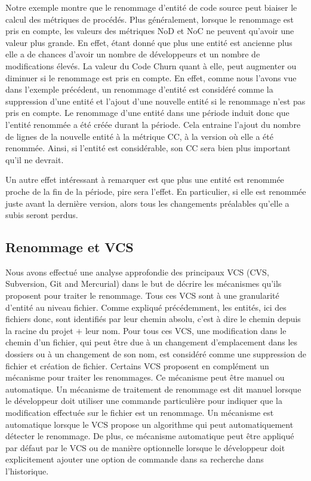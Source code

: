 Notre exemple montre que le renommage d'entité de code source peut biaiser le calcul des métriques de procédés. Plus généralement, lorsque le renommage est pris en compte, les valeurs des métriques NoD et NoC ne peuvent qu'avoir une valeur plus grande. En effet, étant donné que plus une entité est ancienne plus elle a de chances d'avoir un nombre de développeurs et un nombre de modifications élevés. La valeur du Code Churn quant à elle, peut augmenter ou diminuer si le renommage est pris en compte. En effet, comme nous l'avons vue dans l'exemple précédent, un renommage d'entité est considéré comme la suppression d'une entité et l'ajout d'une nouvelle entité si le renommage n'est pas pris en compte. Le renommage d'une entité dans une période induit donc que l'entité renommée a été créée durant la période. Cela entraine l'ajout du nombre de lignes de la nouvelle entité à la métrique CC, à la version où elle a été renommée. Ainsi, si l'entité est considérable, son CC sera bien plus important qu'il ne devrait. 

Un autre effet intéressant à remarquer est que plus une entité est renommée proche de la fin de la période, pire sera l'effet. En particulier, si elle est renommée juste avant la dernière version, alors tous les changements préalables qu'elle a subis seront perdus.\\

\subsection{Renommage et VCS}

Nous avons effectué une analyse approfondie des principaux VCS (CVS, Subversion, Git and Mercurial) dans le but de décrire les mécanismes qu'ils proposent pour traiter le renommage. Tous ces VCS sont à une granularité d'entité au niveau fichier. Comme expliqué précédemment, les entités, ici des fichiers donc, sont identifiés par leur chemin absolu, c'est à dire le chemin depuis la racine du projet $+$ leur nom. Pour tous ces VCS, une modification dans le chemin d'un fichier, qui peut être due à un changement d'emplacement dans les dossiers ou à un changement de son nom, est considéré comme une suppression de fichier et création de fichier. Certains VCS proposent en complément un mécanisme pour traiter les renommages. Ce mécanisme peut être manuel ou automatique. Un mécanisme de traitement de renommage est dit manuel lorsque le développeur doit utiliser une commande particulière pour indiquer que la modification effectuée sur le fichier est un renommage. Un mécanisme est automatique lorsque le VCS propose un algorithme qui peut automatiquement détecter le renommage. De plus, ce mécanisme automatique peut être appliqué par défaut par le VCS ou de manière optionnelle lorsque le développeur doit explicitement ajouter une option de commande dans sa recherche dans l'historique.\\
 
